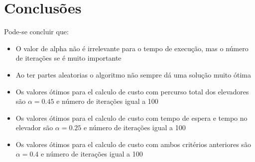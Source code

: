 \section{Conclusões}
	Pode-se concluir que:
	\begin{itemize}
		\item O valor de alpha não é irrelevante para o tempo de execução, mas o número de iterações se é muito importante
		\item Ao ter partes aleatorias o algoritmo não sempre dá uma solução muito ótima 
		\item Os valores ótimos para el calculo de custo com percurso total dos elevadores são $\alpha = 0.45$ e número de iterações igual a 100 %
		\item Os valores ótimos para el calculo de custo com tempo de espera e tempo no elevador são $\alpha = 0.25$ e número de iterações igual a 100 %
		\item Os valores ótimos para el calculo de custo com ambos critérios anteriores são $\alpha = 0.4$ e número de iterações igual a 100 %
	\end{itemize}
	
\clearpage